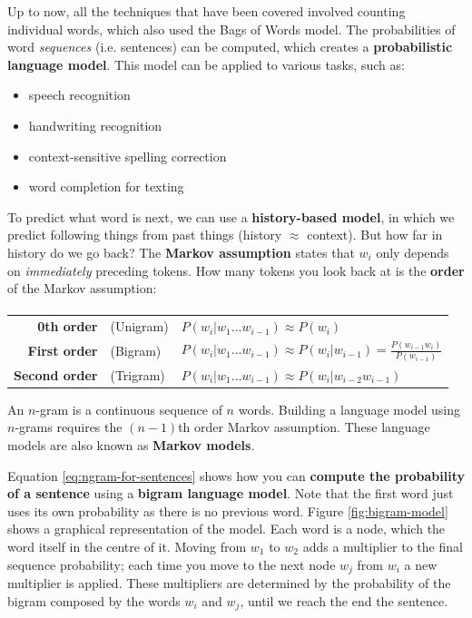 \documentclass{article}
\begin{document}
Up to now, all the techniques that have been covered involved counting individual words, which also used the Bags of Words model. The probabilities of word \textit{sequences} (i.e. sentences) can be computed, which creates a \textbf{probabilistic language model}. This model can be applied to various tasks, such as:
\begin{itemize}
	\item speech recognition
	\item handwriting recognition
	\item context-sensitive spelling correction
	\item word completion for texting
\end{itemize}

To predict what word is next, we can use a \textbf{history-based model}, in which we predict following things from past things (history $\approx$ context).  But how far in history do we go back? The \textbf{Markov assumption} states that $w_i$ only depends on \textit{immediately} preceding tokens. How many tokens you look back at is the \textbf{order} of the Markov assumption:
\paragraph{}
\begin{tabular}{rll}
\textbf{0th order} &(Unigram) & $P(w_i|w_1...w_{i - 1}) \approx P(w_i)$ \\
\textbf{First order} & (Bigram) & $P(w_i|w_1...w_{i - 1}) \approx P(w_i|w_{i-1}) = \frac{P(w_{i-1}w_i)}{P(w_{i-1})}$ \\
\textbf{Second order} & (Trigram) & $P(w_i|w_1...w_{i - 1}) \approx P(w_i|w_{i-2}w_{i-1})$ \\
\end{tabular}

An $n$-gram is a continuous sequence of $n$ words. Building a language model using $n$-grams requires the $(n - 1)$th order Markov assumption. These language models are also known as \textbf{Markov models}.

Equation \ref{eq:ngram-for-sentences} shows how you can \textbf{compute the probability of a sentence} using a \textbf{bigram language model}. Note that the first word just uses its own probability as there is no previous word. Figure \ref{fig:bigram-model} shows a graphical representation of the model. Each word is a node, which the word itself in the centre of it. Moving from $w_1$ to $w_2$ adds a multiplier to the final sequence probability; each time you move to the next node $w_j$ from $w_i$ a new multiplier is applied. These multipliers are determined by the probability of the bigram composed by the words $w_i$ and $w_j$, until we reach the end the sentence.
\end{document}
